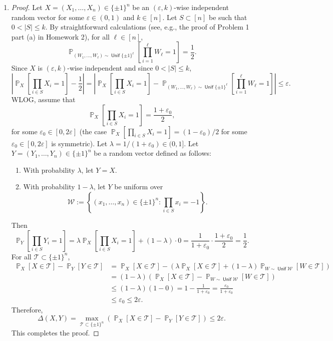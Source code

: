 \documentclass[letterpaper, reqno,11pt]{article}
\newcommand{\PP}{\mathop{{}\mathbb{P}}}
\DeclareMathOperator{\Unif}{\mathsf{Unif}}
\begin{document}
\begin{enumerate}[label=(\alph*)]
  \item \begin{proof}
    Let $X = (X_1, \ldots, X_n) \in \{ \pm 1 \}^n$ be an $(\varepsilon, k)$-wise independent random vector for some $\varepsilon \in (0, 1)$ and $k \in [n]$. Let $S \subset [n]$ be such that $0 < |S| \leq k$. By straightforward calculations (see, e.g., the proof of Problem 1 part (a) in Homework 2), for all $\ell \in [n]$,
    $$ \PP_{\left(W_1, \ldots, W_\ell\right) \sim \Unif\{ \pm 1 \}^\ell}\left[\prod_{i = 1}^\ell W_\ell = 1\right] = \frac{1}{2}. $$
    Since $X$ is $(\varepsilon, k)$-wise independent and since $0 < |S| \leq k$,
    $$ \left|\PP_X\left[\prod_{i \in S} X_i = 1\right] - \frac{1}{2}\right| = \left|\PP_X\left[\prod_{i \in S} X_i = 1\right] - \PP_{\left(W_1, \ldots, W_\ell\right) \sim \Unif\{ \pm 1 \}^\ell}\left[\prod_{i = 1}^\ell W_\ell = 1\right]\right| \leq \varepsilon. $$
    WLOG, assume that
    $$ \PP_X\left[\prod_{i \in S} X_i = 1\right] = \frac{1 + \varepsilon_0}{2}, $$
    for some $\varepsilon_0 \in [0, 2\varepsilon]$ (the case $\PP_X[\prod_{i \in S} X_i = 1] = (1 - \varepsilon_0)/2$ for some $\varepsilon_0 \in [0, 2\varepsilon]$ is symmetric). Let $\lambda = 1/(1 + \varepsilon_0) \in (0, 1]$. Let $Y = (Y_1, \ldots, Y_n) \in \{ \pm 1 \}^n$ be a random vector defined as follows:
    \begin{enumerate}[label=(\roman*), itemsep=0pt]
      \item With probability $\lambda$, let $Y = X$.
      \item With probability $1 - \lambda$, let $Y$ be uniform over
      \begin{equation} \label{eq:4b-case2}
        \mathcal W := \left\{ \left(x_1, \ldots, x_n\right) \in \{ \pm 1 \}^n : \prod_{i \in S} x_i = -1 \right\}.
      \end{equation}
    \end{enumerate}
    Then
    $$ \PP_Y\left[\prod_{i \in S} Y_i = 1\right] = \lambda \PP_X\left[\prod_{i \in S} X_i = 1\right] + (1 - \lambda) \cdot 0 = \frac{1}{1 + \varepsilon_0} \cdot \frac{1 + \varepsilon_0}{2} = \frac{1}{2}. $$
    For all $\mathcal T \subset \{ \pm 1 \}^n$,
    \begin{align*}
      \PP_X[X \in \mathcal T] - \PP_Y[Y \in \mathcal T] &= \PP_X[X \in \mathcal T] - \left(\lambda \PP_X[X \in \mathcal T] + (1 - \lambda) \PP_{W \sim \Unif \mathcal W}[W \in \mathcal T]\right) \\
      &= (1 - \lambda) \left(\PP_X[X \in \mathcal T] - \PP_{W \sim \Unif \mathcal W}[W \in \mathcal T]\right) \\
      &\leq (1 - \lambda) (1 - 0) = 1 - \frac{1}{1 + \varepsilon_0} = \frac{\varepsilon_0}{1 + \varepsilon_0} \\
      &\leq \varepsilon_0 \leq 2\varepsilon.
    \end{align*}
    Therefore,
    $$ \Delta(X, Y) = \max_{\mathcal T \subset \{ \pm 1 \}^n} \left(\PP_X[X \in \mathcal T] - \PP_Y[Y \in \mathcal T]\right) \leq 2\varepsilon. $$
    This completes the proof.
  \end{proof}


\end{enumerate}
\end{document}
